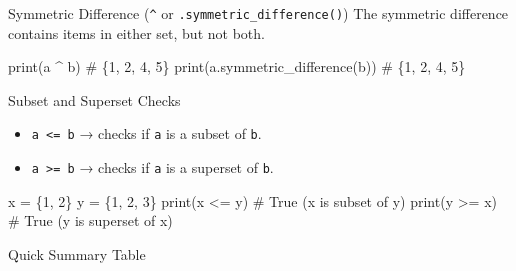 \documentclass[
  letterpaper,
  DIV=11,
  numbers=noendperiod]{scrreprt}
\newenvironment{Shaded}{\begin{snugshade}}{\end{snugshade}}
\newcommand{\BuiltInTok}[1]{\textcolor[rgb]{0.00,0.23,0.31}{#1}}
\newcommand{\CommentTok}[1]{\textcolor[rgb]{0.37,0.37,0.37}{#1}}
\newcommand{\DecValTok}[1]{\textcolor[rgb]{0.68,0.00,0.00}{#1}}
\newcommand{\NormalTok}[1]{\textcolor[rgb]{0.00,0.23,0.31}{#1}}
\newcommand{\OperatorTok}[1]{\textcolor[rgb]{0.37,0.37,0.37}{#1}}
\providecommand{\tightlist}{%
  \setlength{\itemsep}{0pt}\setlength{\parskip}{0pt}}
\begin{document}
Symmetric Difference (\texttt{\^{}} or
\texttt{.symmetric\_difference()}) The symmetric difference contains
items in either set, but not both.

\begin{Shaded}
\begin{Highlighting}[]
\BuiltInTok{print}\NormalTok{(a }\OperatorTok{\^{}}\NormalTok{ b)           }\CommentTok{\# \{1, 2, 4, 5\}}
\BuiltInTok{print}\NormalTok{(a.symmetric\_difference(b))  }\CommentTok{\# \{1, 2, 4, 5\}}
\end{Highlighting}
\end{Shaded}

Subset and Superset Checks

\begin{itemize}
\tightlist
\item
  \texttt{a\ \textless{}=\ b} → checks if \texttt{a} is a subset of
  \texttt{b}.
\item
  \texttt{a\ \textgreater{}=\ b} → checks if \texttt{a} is a superset of
  \texttt{b}.
\end{itemize}

\begin{Shaded}
\begin{Highlighting}[]
\NormalTok{x }\OperatorTok{=}\NormalTok{ \{}\DecValTok{1}\NormalTok{, }\DecValTok{2}\NormalTok{\}}
\NormalTok{y }\OperatorTok{=}\NormalTok{ \{}\DecValTok{1}\NormalTok{, }\DecValTok{2}\NormalTok{, }\DecValTok{3}\NormalTok{\}}
\BuiltInTok{print}\NormalTok{(x }\OperatorTok{\textless{}=}\NormalTok{ y)   }\CommentTok{\# True (x is subset of y)}
\BuiltInTok{print}\NormalTok{(y }\OperatorTok{\textgreater{}=}\NormalTok{ x)   }\CommentTok{\# True (y is superset of x)}
\end{Highlighting}
\end{Shaded}

Quick Summary Table
\end{document}
